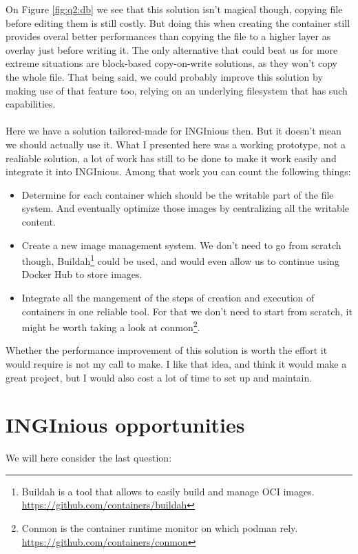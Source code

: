 On Figure \ref{fig:q2:db} we see that this solution isn't magical though, copying file before editing them is still costly.  But doing this when creating the container still provides overal better performances than copying the file to a higher layer as overlay just before writing it.  The only alternative that could beat us for more extreme situations are block-based copy-on-write solutions, as they won't copy the whole file.  That being said, we could probably improve this solution by making use of that feature too, relying on an underlying filesystem that has such capabilities.

\paragraph{}Here we have a solution tailored-made for INGInious then.  But it doesn't mean we should actually use it.  What I presented here was a working prototype, not a realiable solution, a lot of work has still to be done to make it work easily and integrate it into INGInious.  Among that work you can count the following things:
\begin{itemize}
  \item Determine for each container which should be the writable part of the file system.  And eventually optimize those images by centralizing all the writable content.
  \item Create a new image management system.  We don't need to go from scratch though, Buildah\footnote{Buildah is a tool that allows to easily build and manage OCI images. \href{https://github.com/containers/buildah}{https://github.com/containers/buildah}} could be used, and would even allow us to continue using Docker Hub to store images.
  \item Integrate all the mangement of the steps of creation and execution of containers in one reliable tool.  For that we don't need to start from scratch, it might be worth taking a look at conmon\footnote{Conmon is the container runtime monitor on which podman rely.  \href{https://github.com/containers/conmon}{https://github.com/containers/conmon}}.
\end{itemize}

Whether the performance improvement of this solution is worth the effort it would require is not my call to make. I like that idea, and think it would make a great project, but I would also cost a lot of time to set up and maintain.

\section{INGInious opportunities}
We will here consider the last question:
\begin{center}
\end{center}

